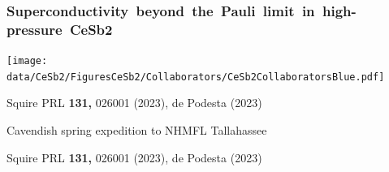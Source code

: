 


\begin{frame}[plain,label=CeSb2Grouplist]
    \frametitle {\mbox{Superconductivity beyond the Pauli limit in high-pressure CeSb2}}
    \texttt{[image: \\data/CeSb2/FiguresCeSb2/Collaborators/CeSb2CollaboratorsBlue.pdf]}
    \vfill
\centerline{\makebox[\linewidth]{\rule{0.85\textwidth}{0.4pt}}}

\centerline{\scriptsize Squire PRL {\bf 131,} 026001 (2023), de Podesta (2023)}

\end{frame}
    
\begin{frame}

\centerline{\small Cavendish spring expedition to NHMFL Tallahassee}

\vspace{0em}
\centerline{\makebox[\linewidth]{\rule{0.85\textwidth}{0.4pt}}}

\centerline{\scriptsize Squire PRL {\bf 131,} 026001 (2023), de Podesta (2023)}

\end{frame}
        


